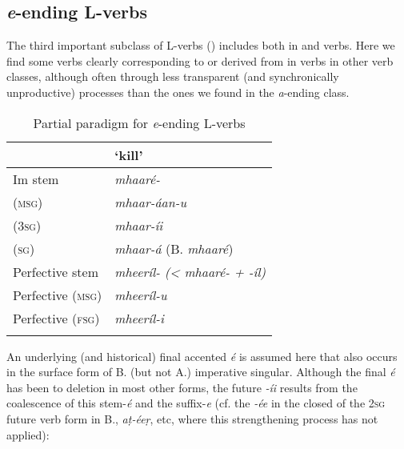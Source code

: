 \subsection{\textit{e}-ending L-verbs}
\label{subsec:8-3-3}


The third important subclass of L-verbs () includes both in and  verbs. Here we find some  verbs clearly corresponding to or derived from in verbs in other verb classes, although often through less transparent (and synchronically unproductive) processes than the ones we found in the \textit{a}-ending class.


\begin{table}[ht]
\caption{Partial paradigm for \textit{e}-ending L-verbs}
\begin{tabularx}{.75\textwidth}{ Q Q }
\lsptoprule
&
`kill'\\\hline
Im stem &
\textit{mhaaré-}\\
 (\textsc{msg}) &
\textit{mhaar-áan-u} \\
 (\textsc{3sg}) &
\textit{mhaar-íi} \\
 (\textsc{sg}) &
\textit{mhaar-á} (B. \textit{mhaaré})\\
Perfective stem &
\textit{mheeríl- ({\textless} mhaaré- + -íl)}\\
Perfective (\textsc{msg}) &
\textit{mheeríl-u} \\
Perfective (\textsc{fsg}) &
\textit{mheeríl-i} \\\lspbottomrule
\end{tabularx}
\label{tab:8-6}
\end{table}


An underlying (and historical) final accented \textit{é} is assumed here that also occurs in the surface form of B. (but not A.) imperative singular. Although the final \textit{é} has been  to deletion in most other forms, the future  \textit{-íi} results from the coalescence of this stem-\textit{é} and the suffix-\textit{e} (cf. the \textit{-ée} in the closed  of the \textsc{2sg} future verb form in B., \textit{aṭ-éeṛ}, etc, where this strengthening process has not applied):


